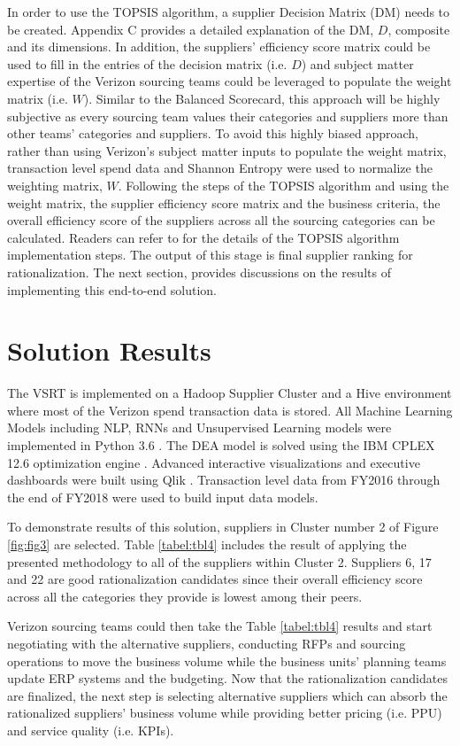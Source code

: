 \documentclass[inte,nonblindrev]{informs3} %
\begin{document}
In order to use the TOPSIS algorithm, a supplier Decision Matrix (DM) needs to be created. Appendix C provides a detailed explanation of the DM, $D$, composite and its dimensions. In addition, the suppliers' efficiency score matrix could be used to fill in the entries of the decision matrix (i.e. $D$) and subject matter expertise of the Verizon sourcing teams could be leveraged to populate the weight matrix (i.e. $W$). Similar to the Balanced Scorecard, this approach will be highly subjective as every sourcing team values their categories and suppliers more than other teams' categories and suppliers. To avoid this highly biased approach, rather than using Verizon's subject matter inputs to populate the weight matrix, transaction level spend data and Shannon Entropy were used to normalize the weighting matrix, $W$. Following the steps of the TOPSIS algorithm and using the weight matrix, the supplier efficiency score matrix and the business criteria, the overall efficiency score of the suppliers across all the sourcing categories can be calculated. Readers can refer to \citep{r4} for the details of the TOPSIS algorithm implementation steps. The output of this stage is final supplier ranking for rationalization. The next section, provides discussions on the results of implementing this end-to-end solution. 

\section{Solution Results}
The VSRT is implemented on a Hadoop Supplier Cluster and a Hive environment \citep{r15} where most of the Verizon spend transaction data is stored. All Machine Learning Models including NLP, RNNs and Unsupervised Learning models were implemented in Python 3.6 \citep{r16}. The DEA model is solved using the IBM CPLEX 12.6 optimization engine \citep{r13}. Advanced interactive visualizations and executive dashboards were built using Qlik \citep{r14}. Transaction level data from FY2016 through the end of FY2018 were used to build input data models.

To demonstrate results of this solution, suppliers in Cluster number 2 of Figure \ref{fig:fig3} are selected. Table \ref{tabel:tbl4} includes the result of applying the presented methodology to all of the suppliers within Cluster 2. Suppliers 6, 17 and 22 are good rationalization candidates since their overall efficiency score across all the categories they provide is lowest among their peers.  

Verizon sourcing teams could then take the Table \ref{tabel:tbl4} results and start negotiating with the alternative suppliers, conducting RFPs and sourcing operations to move the business volume while the business units' planning teams update ERP systems and the budgeting. Now that the rationalization candidates are finalized, the next step is selecting alternative suppliers which can absorb the rationalized suppliers' business volume while providing better pricing (i.e. PPU) and service quality (i.e. KPIs).
\end{document}
